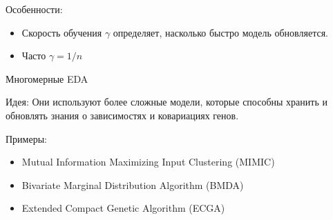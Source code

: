 Особенности: 

\begin{itemize}
      \item Скорость обучения  $\gamma$ определяет, насколько быстро модель обновляется.
      \item Часто  $\gamma = 1/n$ 
   \end{itemize}

Многомерные EDA

Идея: Они используют более сложные модели, которые способны хранить и обновлять знания о зависимостях и ковариациях генов. 

Примеры:

\begin{itemize}
      \item Mutual Information Maximizing Input Clustering (MIMIC)
      \item Bivariate Marginal Distribution Algorithm (BMDA)
      \item Extended Compact Genetic Algorithm (ECGA)
   \end{itemize}

